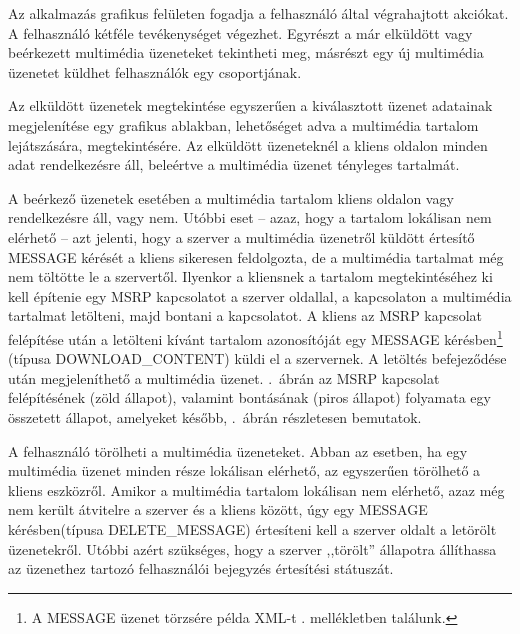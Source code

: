 Az alkalmazás grafikus felületen fogadja a felhasználó által végrahajtott akciókat. A felhasználó kétféle tevékenységet végezhet. Egyrészt a már elküldött vagy beérkezett multimédia üzeneteket tekintheti meg, másrészt egy új multimédia üzenetet küldhet felhasználók egy csoportjának. 

Az elküldött üzenetek megtekintése egyszerűen a kiválasztott üzenet adatainak megjelenítése egy grafikus ablakban, lehetőséget adva a multimédia tartalom lejátszására, megtekintésére. Az elküldött üzeneteknél a kliens oldalon minden adat rendelkezésre áll, beleértve a multimédia üzenet tényleges tartalmát.

A beérkező üzenetek esetében a multimédia tartalom kliens oldalon vagy rendelkezésre áll, vagy nem. Utóbbi eset -- azaz, hogy a tartalom lokálisan nem elérhető -- azt jelenti, hogy a szerver a multimédia üzenetről küldött értesítő MESSAGE kérését a kliens sikeresen feldolgozta, de a multimédia tartalmat még nem töltötte le a szervertől. Ilyenkor a kliensnek a tartalom megtekintéséhez ki kell építenie egy MSRP kapcsolatot a szerver oldallal, a kapcsolaton a multimédia tartalmat letölteni, majd bontani a kapcsolatot. A kliens az MSRP kapcsolat felépítése után a letölteni kívánt tartalom azonosítóját egy MESSAGE kérésben\footnote{A MESSAGE üzenet törzsére példa XML-t . mellékletben találunk.} (típusa DOWNLOAD\_CONTENT) küldi el a szervernek. A letöltés befejeződése után megjeleníthető a multimédia üzenet. .~ábrán az MSRP kapcsolat felépítésének (zöld állapot), valamint bontásának (piros állapot) folyamata egy összetett állapot, amelyeket később, .~ábrán részletesen bemutatok.

A felhasználó törölheti a multimédia üzeneteket. Abban az esetben, ha egy multimédia üzenet minden része lokálisan elérhető, az egyszerűen törölhető a kliens eszközről. Amikor a multimédia tartalom lokálisan nem elérhető, azaz még nem került átvitelre a szerver és a kliens között, úgy egy MESSAGE kérésben\footnotemark[4] (típusa DELETE\_MESSAGE) értesíteni kell a szerver oldalt a letörölt üzenetekről. Utóbbi azért szükséges, hogy a szerver ,,törölt'' állapotra állíthassa az üzenethez tartozó felhasználói bejegyzés értesítési státuszát. 
 
